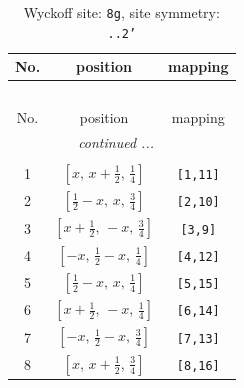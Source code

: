 \documentclass[fleqn,8pt]{jsarticle}
\begin{document}
\begin{longtable}{ccc}
\caption{Wyckoff site: {\tt 8g}, site symmetry: {\tt ..2'}}
 \\
 \hline \hline
No. & position & mapping \\ \hline \endfirsthead

\multicolumn{2}{l}{\tablename\ \thetable{}} \\
 \hline \hline
No. & position & mapping \\ \hline \endhead

 \hline \hline
\multicolumn{2}{r}{\footnotesize\it continued ...} \\ \endfoot

 \hline \hline
\multicolumn{2}{r}{} \\ \endlastfoot

1 & $\left[ x,\, x + \frac{1}{2},\, \frac{1}{4} \right]$ & {\tt [1,11]} \\ \hline
2 & $\left[ \frac{1}{2} - x,\, x,\, \frac{3}{4} \right]$ & {\tt [2,10]} \\ \hline
3 & $\left[ x + \frac{1}{2},\, - x,\, \frac{3}{4} \right]$ & {\tt [3,9]} \\ \hline
4 & $\left[ - x,\, \frac{1}{2} - x,\, \frac{1}{4} \right]$ & {\tt [4,12]} \\ \hline
5 & $\left[ \frac{1}{2} - x,\, x,\, \frac{1}{4} \right]$ & {\tt [5,15]} \\ \hline
6 & $\left[ x + \frac{1}{2},\, - x,\, \frac{1}{4} \right]$ & {\tt [6,14]} \\ \hline
7 & $\left[ - x,\, \frac{1}{2} - x,\, \frac{3}{4} \right]$ & {\tt [7,13]} \\ \hline
8 & $\left[ x,\, x + \frac{1}{2},\, \frac{3}{4} \right]$ & {\tt [8,16]} \\
\end{longtable}
\renewcommand{\arraystretch}{1.2}
\end{document}
